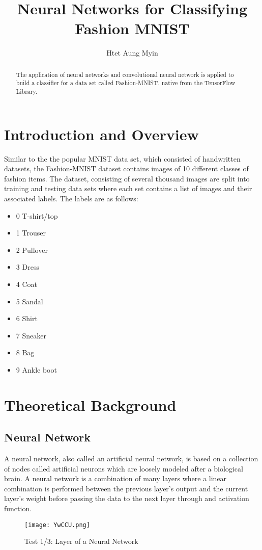 \documentclass[a4paper,12pt]{article}
\begin{document}
\title{Neural Networks for Classifying Fashion MNIST}
\author{Htet Aung Myin}
\maketitle
\begin{abstract}
The application of neural networks and convolutional neural network is applied to build a classifier for a data set called Fashion-MNIST, native from the TensorFlow Library.
\end{abstract}
\newpage
\section{Introduction and Overview}
Similar to the the popular MNIST data set, which consisted of handwritten datasets, the Fashion-MNIST dataset contains images of 10 different classes of fashion items. The dataset, consisting of several thousand images are split into training and testing data sets where each set contains a list of images and their associated labels. The labels are as follows:
\begin{itemize}
\item 0 T-shirt/top
\item 1 Trouser
\item 2 Pullover
\item 3 Dress
\item 4 Coat
\item 5 Sandal
\item 6 Shirt
\item 7 Sneaker
\item 8 Bag
\item 9 Ankle boot
  
\end{itemize}
\section{Theoretical Background}

\subsection{Neural Network}
A neural network, also called an artificial neural network, is based on a collection of nodes called artificial neurons which are loosely modeled after a biological brain. A neural network is a combination of many layers where a linear combination is performed between the previous layer's output and the current layer's weight before passing the data to the next layer through and activation function.
\begin{figure}[h]
	

		\centering
		\texttt{[image: YwCCU.png]}
		\caption{Test 1/3: Layer of a Neural Network}
	

\end{figure}
\end{document}
